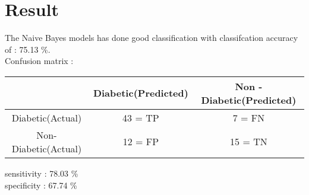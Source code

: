 \section{ Result}
The  Naive Bayes models has done good classification with classifcation accuracy of : 75.13 \%. 
\\Confusion matrix : 
\begin{center}
\begin{tabular}{ c|c|c } 
 & Diabetic(Predicted)& Non - Diabetic(Predicted) \\ 
 \hline
 Diabetic(Actual) & 43 = TP & 7 = FN \\ 
 \hline
 Non-Diabetic(Actual)& 12 = FP & 15  = TN \\ 

\end{tabular}
\end{center}

sensitivity : 78.03 \% \\
 specificity : 67.74 \%


